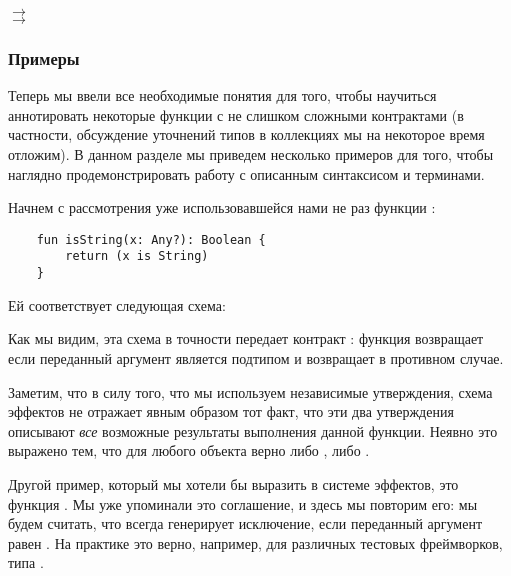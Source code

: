 {
     $\rightarrow$  \\
       $\rightarrow$ 
}
{}



\subsubsection{Примеры}

Теперь мы ввели все необходимые понятия для того, чтобы научиться аннотировать некоторые функции с не слишком сложными контрактами (в частности, обсуждение уточнений типов в коллекциях мы на некоторое время отложим). В данном разделе мы приведем несколько примеров для того, чтобы наглядно продемонстрировать работу с описанным синтаксисом и терминами.

Начнем с рассмотрения уже использовавшейся нами не раз функции :

\begin{verbatim}
    fun isString(x: Any?): Boolean {
        return (x is String)
    }
\end{verbatim}

Ей соответствует следующая схема:

{}

Как мы видим, эта схема в точности передает контракт : функция возвращает  если переданный аргумент является подтипом  и возвращает  в противном случае. 

Заметим, что в силу того, что мы используем независимые утверждения, схема эффектов не отражает явным образом тот факт, что эти два утверждения описывают \emph{все} возможные результаты выполнения данной функции. Неявно это выражено тем, что для любого объекта  верно либо , либо . 


\bigskip


Другой пример, который мы хотели бы выразить в системе эффектов, это функция . Мы уже упоминали это соглашение, и здесь мы повторим его: мы будем считать, что  всегда генерирует исключение, если переданный аргумент равен . На практике это верно, например, для различных тестовых фреймворков, типа .

